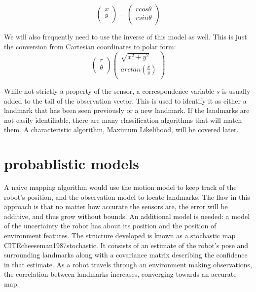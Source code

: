 \documentclass[12pt]{report}
\begin{document}
\begin{equation}\label{pol2cart}
\begin{pmatrix}
 x \\
 y \\
\end{pmatrix} =
\begin{pmatrix}
 r cos \theta \\
 r sin \theta  \\
\end{pmatrix}
\end{equation}

We will also frequently need to use the inverse of this model as well.  This is just the conversion from Cartesian coordinates to polar form:
\begin{equation}\label{cart2pol}
\begin{pmatrix}
 r \\
 \theta \\
\end{pmatrix}
\begin{pmatrix}
 \sqrt{x^2 + y^2}  \\
 arctan(\frac{x}{y}) \\
\end{pmatrix}
\end{equation}

While not strictly a property of the sensor, a correspondence variable $s$ is usually added to the tail of the observation vector.  This is used to identify it as either a landmark that has been seen previously or a new landmark.  If the landmarks are not easily identifiable, there are many classification algorithms that will match them.  A characteristic algorithm, Maximum Likelihood, will be covered later. 

\section{probablistic models}
A naive mapping algorithm would use the motion model to keep track of the robot's position, and the observation model to locate landmarks.  The flaw in this approach is that no matter how accurate the sensors are, the error will be additive, and thus grow without bounds.  An additional model is needed: a model of the uncertainty the robot has about its position and the position of environment features.  The structure developed is known as a stochastic map CITE{cheeseman1987stochastic}.  It consists of an estimate of the robot's pose and surrounding landmarks along with a covariance matrix describing the confidence in that estimate.  As a robot travels through an environment making observations, the correlation between landmarks increases, converging towards an accurate map.  
\end{document}
